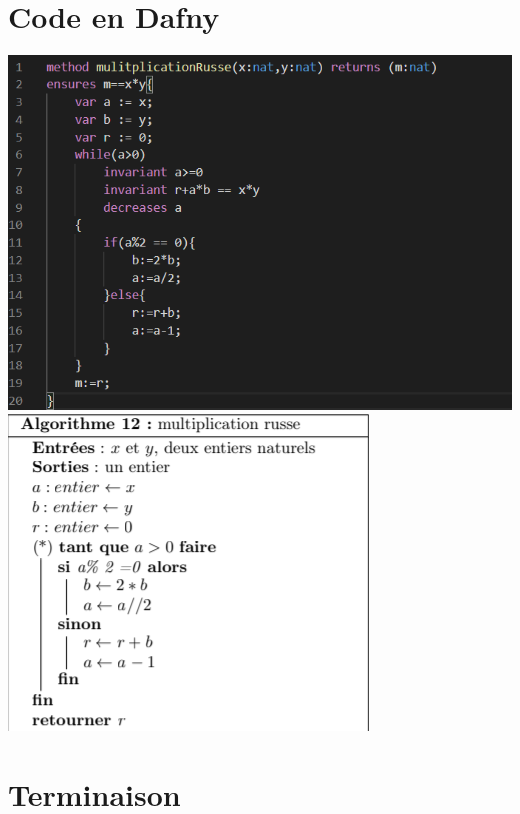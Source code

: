 \documentclass[12pt,a4paper]{report}
\begin{document}
\chapter{Code en Dafny}
\includegraphics[scale=0.45]{algoDafny} 
\includegraphics[scale=0.5]{algoRusse} 





\chapter{Terminaison }
\end{document}
